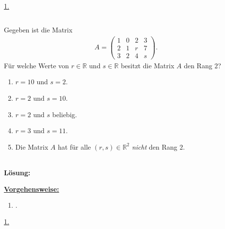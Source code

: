 \underline{1. }\\
\newpage

\subsection*{}
Gegeben ist die Matrix
\begin{align*}
	A =
	\begin{pmatrix}
		1 & 0 & 2 & 3 \\
		2 & 1 & r & 7 \\
		3 & 2 & 4 &  s 
	\end{pmatrix}.
\end{align*}
Für welche Werte von $ r \in \mathbb{R} $ und $ s \in \mathbb{R} $ besitzt die Matrix $ A $ den Rang $ 2 $?
\renewcommand{\labelenumi}{(\alph{enumi})}
\begin{enumerate}
	\item 
	$ r = 10 $ und $ s = 2 $.
	\item 
	$ r =  2 $ und $ s = 10 $.
	\item
	$ r = 2 $ und $ s $ beliebig.
	\item
	$ r = 3 $ und $ s = 11 $.
	\item
	Die Matrix $ A $ hat für alle $ (r,s) \in \mathbb{R}^2 $ \textit{nicht} den Rang $ 2 $.
\end{enumerate}
\ \\
\textbf{Lösung:}
\begin{mdframed}
\underline{\textbf{Vorgehensweise:}}
\renewcommand{\labelenumi}{\theenumi.}
\begin{enumerate}
\item .
\end{enumerate}
\end{mdframed}

\underline{1. }\\
\newpage

